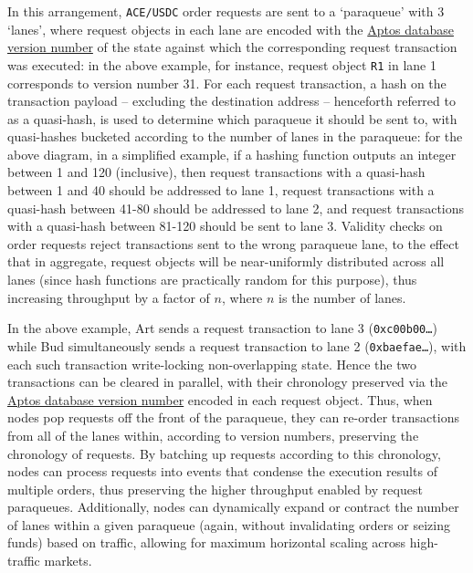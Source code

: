 \documentclass{scrartcl}
\begin{document}
In this arrangement, \texttt{ACE/USDC} order requests are sent to a `paraqueue' with 3 `lanes', where request objects in each lane are encoded with the \href{https://aptos.dev/basics/basics-txns-states/#versioned-database}{Aptos database version number} of the state against which the corresponding request transaction was executed:
in the above example, for instance, request object \texttt{R1} in lane 1 corresponds to version number 31.
For each request transaction, a hash on the transaction payload -- excluding the destination address -- henceforth referred to as a quasi-hash, is used to determine which paraqueue it should be sent to, with quasi-hashes bucketed according to the number of lanes in the paraqueue:
for the above diagram, in a simplified example, if a hashing function outputs an integer between 1 and 120 (inclusive), then request transactions with a quasi-hash between 1 and 40 should be addressed to lane 1, request transactions with a quasi-hash between 41-80 should be addressed to lane 2, and request transactions with a quasi-hash between 81-120 should be sent to lane 3.
Validity checks on order requests reject transactions sent to the wrong paraqueue lane, to the effect that in aggregate, request objects will be near-uniformly distributed across all lanes (since hash functions are practically random for this purpose), thus increasing throughput by a factor of $ n $, where $ n $ is the number of lanes.

In the above example, Art sends a request transaction to lane 3 (\texttt{0xc00b00\ldots}) while Bud simultaneously sends a request transaction to lane 2 (\texttt{0xbaefae\ldots}), with each such transaction write-locking non-overlapping state.
Hence the two transactions can be cleared in parallel, with their chronology preserved via the \href{https://aptos.dev/basics/basics-txns-states/#versioned-database}{Aptos database version number} encoded in each request object.
Thus, when nodes pop requests off the front of the paraqueue, they can re-order transactions from all of the lanes within, according to version numbers, preserving the chronology of requests.
By batching up requests according to this chronology, nodes can process requests into events that condense the execution results of multiple orders, thus preserving the higher throughput enabled by request paraqueues.
Additionally, nodes can dynamically expand or contract the number of lanes within a given paraqueue (again, without invalidating orders or seizing funds) based on traffic, allowing for maximum horizontal scaling across high-traffic markets.
\end{document}
